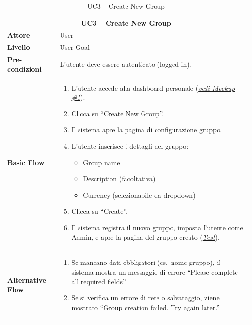 \begin{table}[htbp]
    \centering
    \footnotesize
    \begin{tabularx}{\textwidth}{|l|X|}
        \hline
        \multicolumn{2}{|c|}{\textbf{UC3 -- Create New Group}} \\
        \hline
        \textbf{Attore} & User \\
        \hline
        \textbf{Livello} & User Goal \\
        \hline
        \textbf{Pre-condizioni} & L'utente deve essere autenticato (logged in). \\
        \hline
        \textbf{Basic Flow} & 
        \begin{enumerate}[leftmargin=*, nosep, topsep=3pt]
            \item L'utente accede alla dashboard personale (\hyperref[fig:dashboard]{\textit{vedi Mockup \#1}}).
            \item Clicca su ``Create New Group''.
            \item Il sistema apre la pagina di configurazione gruppo.
            \item L'utente inserisce i dettagli del gruppo:
            \begin{itemize}[nosep, label={--}, topsep=2pt]
                \item Group name
                \item Description (facoltativa)
                \item Currency (selezionabile da dropdown)
            \end{itemize}
            \item Clicca su ``Create''.
            \item Il sistema registra il nuovo gruppo, imposta l'utente come Admin, e apre la pagina del gruppo creato (\hyperref[test:uc3_create]{\textit{Test}}).
        \end{enumerate} \\
        \hline
        \textbf{Alternative Flow} & 
        \begin{enumerate}[label=5\alph*., leftmargin=*, nosep, topsep=3pt]
            \item Se mancano dati obbligatori (es.\ nome gruppo), il sistema mostra un messaggio di errore ``Please complete all required fields''.
            \item Se si verifica un errore di rete o salvataggio, viene mostrato ``Group creation failed. Try again later.''
        \end{enumerate} \\
        \hline
    \end{tabularx}
    \caption{UC3 -- Create New Group}
    \label{tab:uc3}
\end{table}

